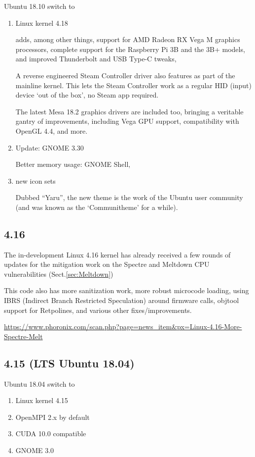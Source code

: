 Ubuntu 18.10 switch to 
\begin{enumerate}
  \item Linux kernel 4.18
  
adds, among other things, support for AMD Radeon RX Vega M graphics processors, complete support for the Raspberry Pi 3B and the 3B+ models, and improved Thunderbolt and USB Type-C tweaks,

A reverse engineered Steam Controller driver also features as part of the mainline kernel. This lets the Steam Controller work as a regular HID (input) device ‘out of the box’, no Steam app required.

The latest Mesa 18.2 graphics drivers are included too, bringing a veritable gantry of improvements, including Vega GPU support, compatibility with OpenGL 4.4, and more.
  
  \item Update: GNOME 3.30
  
Better memory usage: GNOME Shell, 
  
  \item new icon sets
  
  Dubbed “Yaru”, the new theme is the work of the Ubuntu user community (and was known as the ‘Communitheme’ for a while). 
  
\end{enumerate}


\subsection{4.16}
\label{sec:linux-kernel-4.16}

The in-development Linux 4.16 kernel has already received a few rounds of
updates for the mitigation work on the Spectre and Meltdown CPU vulnerabilities
(Sect.\ref{sec:Meltdown})


This code also has more sanitization work, more robust microcode loading, using
IBRS (Indirect Branch Restricted Speculation) around firmware calls, objtool
support for Retpolines, and various other fixes/improvements.

\url{https://www.phoronix.com/scan.php?page=news_item&px=Linux-4.16-More-Spectre-Melt}


\subsection{4.15 (LTS Ubuntu 18.04)}
\label{sec:linux-kernel-4.15}

Ubuntu 18.04 switch to 
\begin{enumerate}
  \item Linux kernel 4.15
  
  \item OpenMPI 2.x by default
  
  \item CUDA 10.0 compatible
  
  \item GNOME 3.0
\end{enumerate}


